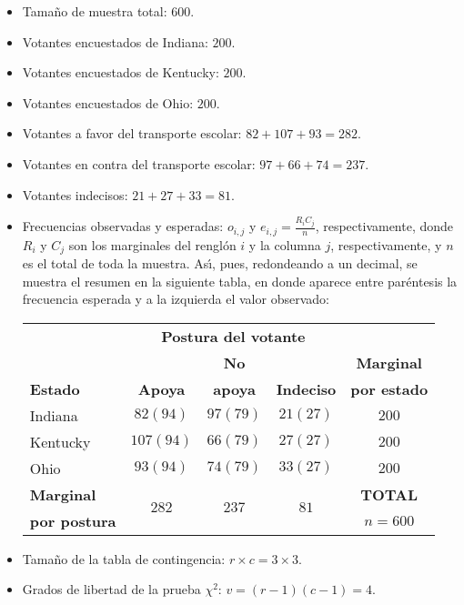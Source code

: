 \begin{solucion}
 \begin{datos}
  $\phantom{0}$
  \begin{itemize}
   \item Tamaño de muestra total: $600$.
   \item Votantes encuestados de Indiana: $200$.
   \item Votantes encuestados de Kentucky: $200$.
   \item Votantes encuestados de Ohio: $200$.
   \item Votantes a favor del transporte escolar: $82+107+93 = 282$.
   \item Votantes en contra del transporte escolar: $97+66+74 = 237$.
   \item Votantes indecisos: $21+27+33 = 81$.
   \item Frecuencias observadas y esperadas: $o_{i,j}$
   y $e_{i,j}=\frac{R_i C_j}{n}$, respectivamente,
   donde $R_i$ y $C_j$ son los marginales del rengl\'on $i$ y la columna $j$,
   respectivamente, y $n$ es el total de toda la muestra.
   As\'{\i}, pues, redondeando a un decimal, se muestra el resumen 
   en la siguiente tabla,
   en donde aparece entre par\'entesis la frecuencia esperada
   y a la izquierda el valor observado:
   \begin{center}
    \begin{tabular}{lccc|c}
     & \multicolumn{3}{c}{\textbf{Postura del votante}} \\
     \cline{2-4}
     & & \textbf{No} & & \textbf{Marginal} \\
     \textbf{Estado} & \textbf{Apoya} & \textbf{apoya} & \textbf{Indeciso} &
     \textbf{por estado} \\
     \hline 
     Indiana & $82 (94)$ & $97 (79)$ & $21 (27)$ & $200$ \\
     Kentucky & $107 (94)$ & $66 (79)$ & $27 (27)$ & $200$ \\
     Ohio & $93 (94)$ & $74 (79)$ & $33 (27)$ & $200$ \\
     \hline 
     \textbf{Marginal} & \multirow{2}{*}{$282$} & \multirow{2}{*}{$237$} &
     \multirow{2}{*}{$81$} & \textbf{TOTAL} \\
     \textbf{por postura} & & & & $n=600$
    \end{tabular}
   \end{center}
   \item Tama\~no de la tabla de contingencia: $r\times c = 3\times 3$.
   \item Grados de libertad de la prueba $\chi^2$: $v = (r-1)(c-1) = 4$.
  \end{itemize}
 \end{datos}
 

\end{solucion}
